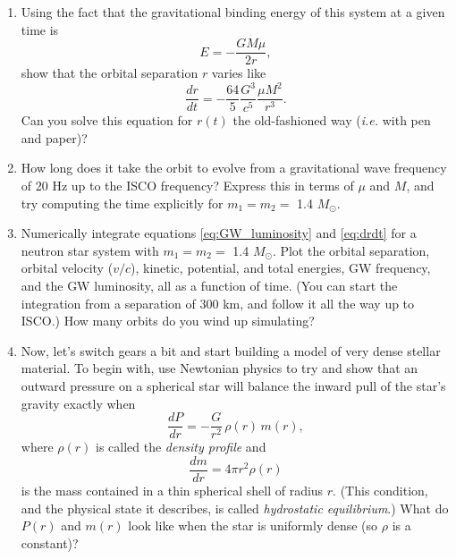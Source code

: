 \documentclass[11pt]{article}
\begin{document}
\vspace{1000pt}

\begin{enumerate}

\item Using the fact that the gravitational binding energy of this system at a given time is
\[ E = - \frac{GM\mu}{2r}, \]
show that the orbital separation $r$ varies like
\begin{equation}\label{eq:drdt}
\frac{dr}{dt} = - \frac{64}{5} \frac{G^3}{c^5} \frac{\mu M^2}{r^3}.
\end{equation}
Can you solve this equation for $r(t)$ the old-fashioned way (\textit{i.e.} with pen and paper)?

\item How long does it take the orbit to evolve from a gravitational wave frequency of 20 Hz up to the ISCO frequency? Express this in terms of $\mu$ and $M$, and try computing the time explicitly for $m_1 = m_2 =$ 1.4 $M_{\odot}$.

\item Numerically integrate equations \ref{eq:GW_luminosity} and \ref{eq:drdt} for a neutron star system with $m_1 = m_2 =$ 1.4 $M_{\odot}$. Plot the orbital separation, orbital velocity ($v/c$), kinetic, potential, and total energies, GW frequency, and the GW luminosity, all as a function of time. (You can start the integration from a separation of 300 km, and follow it all the way up to ISCO.) How many orbits do you wind up simulating?

\item Now, let's switch gears a bit and start building a model of very dense stellar material. To begin with, use Newtonian physics to try and show that an outward pressure on a spherical star will balance the inward pull of the star's gravity exactly when
\begin{equation}\label{eq:hydro}
\frac{dP}{dr} = - \frac{G}{r^2}\, \rho(r)\, m(r),
\end{equation}
where $\rho(r)$ is called the \textit{density profile} and
\begin{equation}\label{eq:mass}
\frac{dm}{dr} = 4 \pi r^2 \rho(r)
\end{equation}
is the mass contained in a thin spherical shell of radius $r$. (This condition, and the physical state it describes, is called \textit{hydrostatic equilibrium}.) What do $P(r)$ and $m(r)$ look like when the star is uniformly dense (so $\rho$ is a constant)?


\end{enumerate}
\end{document}
